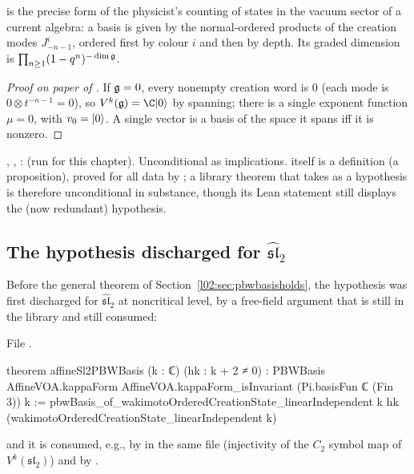 \begin{physics}
 is the precise form of the physicist's counting of states in the vacuum sector of a
current algebra: a basis is given by the normal-ordered products of the creation modes
$J^{i}_{-n-1}$, ordered first by colour $i$ and then by depth. Its graded dimension is
$\prod_{n\ge1}(1-q^n)^{-\dim\mathfrak{g}}$.
\end{physics}

\begin{proof}[Proof on paper of \allowbreak{}\allowbreak{}\allowbreak{}]
If $\mathfrak{g} = 0$, every nonempty creation word is $0$ (each mode is $0\otimes t^{-n-1} = 0$), so
$V^k(\ltwog) = \C\ltwovac$ by spanning; there is a single exponent function $\mu = 0$, with $v_0 = |0\rangle$.
A single vector is a basis of the space it spans iff it is nonzero.
\end{proof}

\begin{status}
\allowbreak{}\allowbreak{}, \allowbreak{}\allowbreak{}\allowbreak{}\allowbreak{},
\allowbreak{}\allowbreak{}\allowbreak{}\allowbreak{}:  (run for this
chapter). Unconditional as implications.  itself is a definition (a proposition), proved
for all data by ; a library theorem that takes  as a
hypothesis is therefore unconditional in substance, though its Lean statement still displays the (now
redundant) hypothesis.
\end{status}

\subsection{The hypothesis discharged for \texorpdfstring{$\widehat{\mathfrak{sl}}_2$}{affine sl2}}

Before the general theorem of Section~\ref{l02:sec:pbwbasisholds}, the hypothesis was first discharged
for $\widehat{\mathfrak{sl}}_2$ at noncritical level, by a free-field argument that is still in the library
and still consumed:

File .
\begin{leancode}
theorem affineSl2PBWBasis (k : ℂ) (hk : k + 2 ≠ 0) :
    PBWBasis AffineVOA.kappaForm AffineVOA.kappaForm_isInvariant
      (Pi.basisFun ℂ (Fin 3)) k :=
  pbwBasis_of_wakimotoOrderedCreationState_linearIndependent k hk
    (wakimotoOrderedCreationState_linearIndependent k)
\end{leancode}
and it is consumed, e.g., by \allowbreak{}\allowbreak{} in the same file (injectivity of the
$C_2$ symbol map of $V^k(\mathfrak{sl}_2)$) and by .


